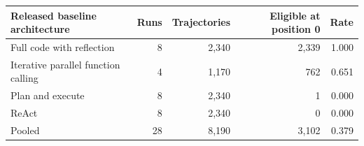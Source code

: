 \begin{tabular}{@{}lrrrr@{}}
\toprule
Released baseline architecture & Runs & Trajectories & Eligible at position 0 & Rate \\
\midrule
Full code with reflection             &  8 & 2{,}340 & 2{,}339 & 1.000 \\
Iterative parallel function calling   &  4 & 1{,}170 &    762 & 0.651 \\
Plan and execute                      &  8 & 2{,}340 &      1 & 0.000 \\
ReAct                                 &  8 & 2{,}340 &      0 & 0.000 \\
\midrule
Pooled                                & 28 & 8{,}190 & 3{,}102 & 0.379 \\
\bottomrule
\end{tabular}
